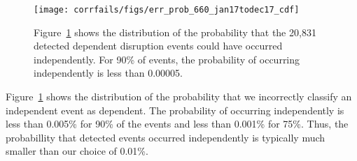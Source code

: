\begin{figure}[t]
  \centering
  \texttt{[image: corrfails/figs/err\_prob\_660\_jan17todec17\_cdf]} 
\caption{
   \label{fig:err_prob}
Figure~\ref{fig:err_prob} shows the distribution of the
probability that the 20,831 detected dependent disruption events could have occurred
independently. For 90\% of events, the probability of occurring
independently is less than 0.00005.
 }
\end{figure} 

Figure~\ref{fig:err_prob} shows the distribution of the probability that
we incorrectly classify an independent event as dependent. The probability of occurring
independently is less than 0.005\% for 90\% of the events and less
than 0.001\% for 75\%. Thus, the probabillity that detected events
occurred independently is typically much smaller than our choice of
0.01\%.

